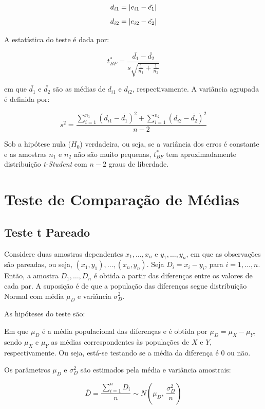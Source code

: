 \documentclass[
]{estat/estat}
\begin{document}
\[ d_{i1} = |e_{i1} - \Tilde{e_1}| \]
\[ d_{i2} = |e_{i2} - \Tilde{e_2}| \]

A estatística do teste é dada por:

\[ t^*_{BF} = \frac{\bar{d_1} - \bar{d_2}}{s\sqrt{\frac{1}{n_1} + \frac{1}{n_2}}} \]

em que \(\bar{d_1}\) e \(\bar{d_2}\) são as médias de \(d_{i1}\) e
\(d_{i2}\), respectivamente. A variância agrupada é definida por:

\[ s^2 = \frac{\displaystyle \sum_{i=1}^{n_1}(d_{i1} - \bar{d_1})^2 + \displaystyle \sum_{i=1}^{n_2}(d_{i2} - \bar{d_2})^2}{n - 2} \]

Sob a hipótese nula (\(H_0\)) verdadeira, ou seja, se a variância dos
erros é constante e as amostras \(n_1\) e \(n_2\) não são muito
pequenas, \(t^*_{BF}\) tem aproximadamente distribuição
\textit{t-Student} com \(n - 2\) graus de liberdade.

\section{Teste de Comparação de
Médias}\label{teste-de-comparauxe7uxe3o-de-muxe9dias}

\subsection{Teste t Pareado}\label{teste-t-pareado}

Considere duas amostras dependentes \(x_1, \ldots, x_n\) e
\(y_1, \ldots, y_n\), em que as observações são pareadas, ou seja,
\((x_1, y_1), \ldots, (x_n, y_n)\). Seja \(D_i = x_i - y_i\), para
\(i = 1, \ldots, n\). Então, a amostra \(D_1, \ldots, D_n\) é obtida a
partir das diferenças entre os valores de cada par. A suposição é de que
a população das diferenças segue distribuição Normal com média \(\mu_D\)
e variância \(\sigma_D^2\).

As hipóteses do teste são:


Em que \(\mu_D\) é a média populacional das diferenças e é obtida por
\(\mu_D = \mu_X - \mu_Y\), sendo \(\mu_X\) e \(\mu_Y\) as médias
correspondentes às populações de \(X\) e \(Y\), respectivamente. Ou
seja, está-se testando se a média da diferença é 0 ou não.

Os parâmetros \(\mu_D\) e \(\sigma_D^2\) são estimados pela média e
variância amostrais:

\[\bar{D} = \frac{\displaystyle \sum_{i=1}^{n} D_i}{n} \sim N\left(\mu_D, \, \frac{\sigma_D^2}{n}\right) \]
\end{document}
